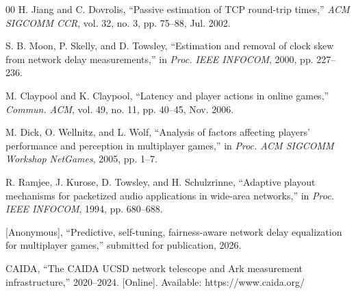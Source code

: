 \documentclass[conference]{IEEEtran}
\begin{document}
\begin{thebibliography}{00}
 H. Jiang and C. Dovrolis, ``Passive estimation of TCP round-trip times,'' \textit{ACM SIGCOMM CCR}, vol. 32, no. 3, pp. 75--88, Jul. 2002.

 S. B. Moon, P. Skelly, and D. Towsley, ``Estimation and removal of clock skew from network delay measurements,'' in \textit{Proc. IEEE INFOCOM}, 2000, pp. 227--236.

 M. Claypool and K. Claypool, ``Latency and player actions in online games,'' \textit{Commun. ACM}, vol. 49, no. 11, pp. 40--45, Nov. 2006.

 M. Dick, O. Wellnitz, and L. Wolf, ``Analysis of factors affecting players' performance and perception in multiplayer games,'' in \textit{Proc. ACM SIGCOMM Workshop NetGames}, 2005, pp. 1--7.

 R. Ramjee, J. Kurose, D. Towsley, and H. Schulzrinne, ``Adaptive playout mechanisms for packetized audio applications in wide-area networks,'' in \textit{Proc. IEEE INFOCOM}, 1994, pp. 680--688.

 [Anonymous], ``Predictive, self-tuning, fairness-aware network delay equalization for multiplayer games,'' submitted for publication, 2026.

 CAIDA, ``The CAIDA UCSD network telescope and Ark measurement infrastructure,'' 2020--2024. [Online]. Available: https://www.caida.org/

\end{thebibliography}
\end{document}
